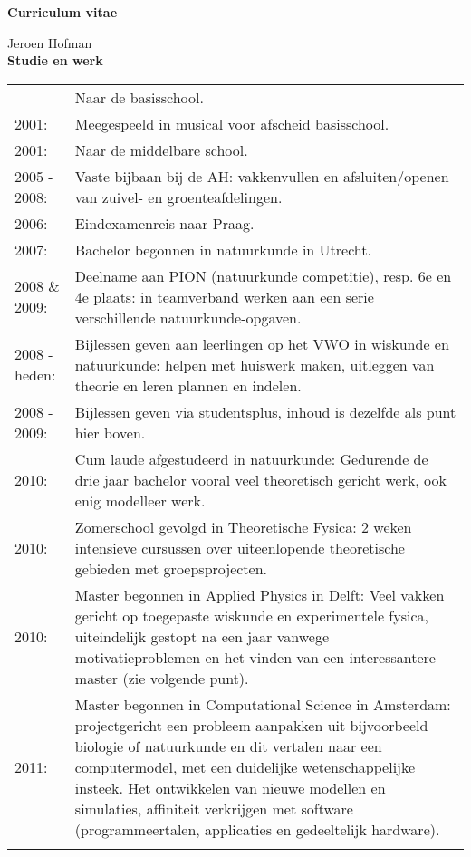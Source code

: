 \documentclass[11pt,a4paper,onecolumn]{article}
\begin{document}
{\huge \textbf{Curriculum vitae}}

{\Large Jeroen Hofman }\\

{\Large \textbf{Studie en werk} }
\begin{longtable}{l l}
  \begin{tabular}{p{} p{}}
    1993: & Naar de basisschool. \\
    2001: & Meegespeeld in musical voor afscheid basisschool. \\
    2001: & Naar de middelbare school. \\
    2005 - 2008: & Vaste bijbaan bij de AH: vakkenvullen en afsluiten/openen van zuivel- en groenteafdelingen.\\
    2006: & Eindexamenreis naar Praag. \\
    2007: & Bachelor begonnen in natuurkunde in Utrecht. \\
    2008 \& 2009: & Deelname aan PION (natuurkunde competitie), resp. 6e en 4e plaats: in teamverband werken aan een serie verschillende natuurkunde-opgaven.\\
    2008 - heden: & Bijlessen geven aan leerlingen op het VWO in wiskunde en natuurkunde: helpen met huiswerk maken, uitleggen van theorie en leren plannen en indelen. \\
    2008 - 2009: & Bijlessen geven via studentsplus, inhoud is dezelfde als punt hier boven.\\
    2010: & Cum laude afgestudeerd in natuurkunde: Gedurende de drie jaar bachelor vooral veel theoretisch gericht werk, ook enig modelleer werk.\\
    2010: & Zomerschool gevolgd in Theoretische Fysica: 2 weken intensieve cursussen over uiteenlopende theoretische gebieden met groepsprojecten.\\
    2010: & Master begonnen in Applied Physics in Delft: Veel vakken gericht op toegepaste wiskunde en experimentele fysica, uiteindelijk gestopt na een jaar vanwege motivatieproblemen en het vinden van een interessantere master (zie volgende punt).\\
    2011: & Master begonnen in Computational Science in Amsterdam: projectgericht een probleem aanpakken uit bijvoorbeeld biologie of natuurkunde en dit vertalen naar een computermodel, met een duidelijke wetenschappelijke insteek. Het ontwikkelen van nieuwe modellen en simulaties, affiniteit verkrijgen met software (programmeertalen, applicaties en gedeeltelijk hardware).\\

\end{tabular}
\end{longtable}
\end{document}
